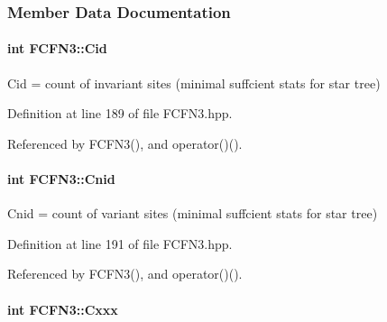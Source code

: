 \subsubsection{\-Member \-Data \-Documentation}
\hypertarget{classFCFN3_ad9e40b33eda0764e3a289dd6be269be3}{
\paragraph[{\-Cid}]{\setlength{\rightskip}{0pt plus 5cm}int {\bf \-F\-C\-F\-N3\-::\-Cid}}}\label{classFCFN3_ad9e40b33eda0764e3a289dd6be269be3}


\-Cid = count of invariant sites (minimal suffcient stats for star tree) 



\-Definition at line 189 of file \-F\-C\-F\-N3.\-hpp.



\-Referenced by \-F\-C\-F\-N3(), and operator()().

\hypertarget{classFCFN3_a8ef5d6f9df7caa72a6dd86d65c22eb3c}{
\paragraph[{\-Cnid}]{\setlength{\rightskip}{0pt plus 5cm}int {\bf \-F\-C\-F\-N3\-::\-Cnid}}}\label{classFCFN3_a8ef5d6f9df7caa72a6dd86d65c22eb3c}


\-Cnid = count of variant sites (minimal suffcient stats for star tree) 



\-Definition at line 191 of file \-F\-C\-F\-N3.\-hpp.



\-Referenced by \-F\-C\-F\-N3(), and operator()().

\hypertarget{classFCFN3_a70ede8e738b72b8bea0ba6eb5e44e884}{
\paragraph[{\-Cxxx}]{\setlength{\rightskip}{0pt plus 5cm}int {\bf \-F\-C\-F\-N3\-::\-Cxxx}}}\label{classFCFN3_a70ede8e738b72b8bea0ba6eb5e44e884}


